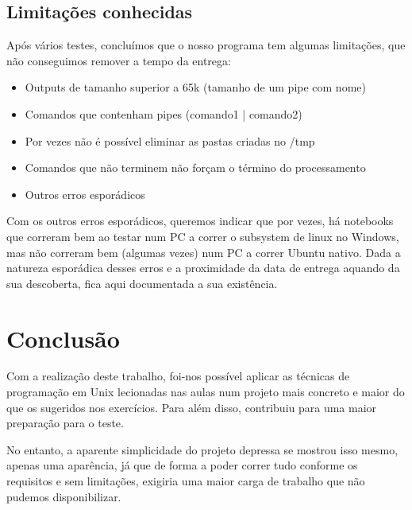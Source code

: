 \documentclass[a4paper]{article}
\begin{document}
	\subsection{Limitações conhecidas}
		\tab Após vários testes, concluímos que o nosso programa tem algumas limitações,
		que não conseguimos remover a tempo da entrega:
			\begin{itemize}
				\item Outputs de tamanho superior a 65k (tamanho de um pipe com nome)
				\item Comandos que contenham pipes (comando1 | comando2)
				\item Por vezes não é possível eliminar as pastas criadas no /tmp
				\item Comandos que não terminem não forçam o término do processamento
				\item Outros erros esporádicos
			\end{itemize}
		\par Com os outros erros esporádicos, queremos indicar que por vezes, há notebooks
		que correram bem ao testar num PC a correr o subsystem de linux no Windows, mas
		não correram bem (algumas vezes) num PC a correr Ubuntu nativo. Dada a natureza
		esporádica desses erros e a proximidade da data de entrega aquando da sua descoberta,
		fica aqui documentada a sua existência.

	\section{Conclusão}
	\tab Com a realização deste trabalho, foi-nos possível aplicar as técnicas
	de programação em Unix lecionadas nas aulas num projeto mais concreto e maior
	do que os sugeridos nos exercícios. Para além disso, contribuiu para uma maior
	preparação para o teste.
	\par No entanto, a aparente simplicidade do projeto depressa se mostrou isso mesmo,
	apenas uma aparência, já que de forma a poder correr tudo conforme os requisitos
	e sem limitações, exigiria uma maior carga de trabalho que não pudemos disponibilizar.
\end{document}

